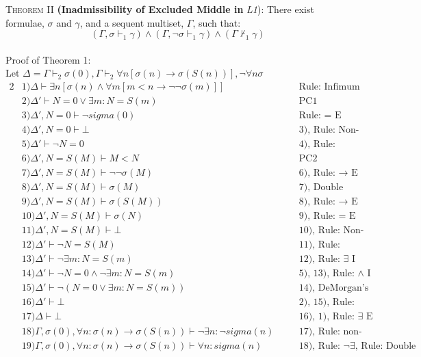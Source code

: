 \documentclass[article]{journal}
\newcommand{\justif}[2]{&{#1}&\text{#2}}
\begin{document}
\textsc{Theorem II} \textbf{(Inadmissibility of Excluded Middle in} \textit{L1}): There exist formulae, $\sigma$ and $\gamma$, and a sequent multiset, $\Gamma$, such that: 
$$(\Gamma, \sigma \vdash_1 \gamma) \wedge (\Gamma, \lnot\sigma \vdash_1 \gamma) \wedge (\Gamma \not\vdash_1 \gamma)$$
\hfill \\
Proof of Theorem 1:\\
Let $\Delta = \Gamma \vdash_2 \sigma(0), \Gamma \vdash_2 \forall n[\sigma(n) \to \sigma(S(n))], \lnot\forall n\sigma$
\begin{alignat*}{2}
&1) \Delta \vdash \exists n[\sigma(n) \wedge \forall m[m < n \to \lnot\lnot\sigma(m)]]		\justif{\quad}{Rule: Infimum}\\
&2) \Delta' \vdash N=0 \vee \exists m: N = S(m)		\justif{\quad}{PC1}\\
&3) \Delta', N=0 \vdash \lnot sigma(0)				\justif{\quad}{Rule: = E}\\
&4) \Delta', N=0 \vdash \bot                			\justif{\quad}{3), Rule: Non-contradiction}\\
&5) \Delta' \vdash \lnot N=0							\justif{\quad}{4), Rule: Reductio ad absurdum}\\
&6) \Delta', N=S(M) \vdash M < N						\justif{\quad}{PC2}\\  
&7) \Delta', N=S(M) \vdash \lnot\lnot\sigma(M) 		\justif{\quad}{6), Rule: $\to$ E}\\
&8) \Delta', N=S(M) \vdash \sigma(M) 				\justif{\quad}{7), Double Negation}\\
&9) \Delta', N=S(M) \vdash \sigma(S(M)) 				\justif{\quad}{8), Rule: $\to$ E}\\
&10) \Delta', N=S(M) \vdash \sigma(N) 				\justif{\quad}{9), Rule: = E}\\
&11) \Delta', N=S(M) \vdash \bot 					\justif{\quad}{10), Rule: Non-contradiction}\\
&12) \Delta' \vdash \lnot N=S(M) 					\justif{\quad}{11), Rule: Reductio ad absurdum}\\
&13) \Delta' \vdash \lnot\exists m: N=S(m) 			\justif{\quad}{12), Rule: $\exists$ I}\\
&14) \Delta' \vdash \lnot N=0 \wedge \lnot\exists m: N=S(m) 		\justif{\quad}{5), 13), Rule: $\wedge$ I}\\
&15) \Delta' \vdash \lnot (N=0 \vee \exists m: N=S(m)) 			\justif{\quad}{14), DeMorgan's Theorem}\\
&16) \Delta' \vdash \bot 							\justif{\quad}{2), 15), Rule: Non-contradiction}\\
&17) \Delta \vdash \bot 								\justif{\quad}{16), 1), Rule: $\exists$ E}\\
&18) \Gamma, \sigma(0), \forall n: \sigma(n) \to \sigma(S(n)) \vdash \lnot \exists n: \lnot sigma(n) \justif{\quad}{17), Rule: non-contradiction}\\
&19) \Gamma, \sigma(0), \forall n: \sigma(n) \to \sigma(S(n)) \vdash \forall n: sigma(n) \justif{\quad}{18), Rule: $\lnot \exists$, Rule: Double Negation}
\end{alignat*}
\end{document}
